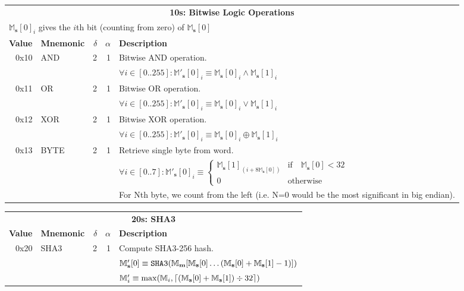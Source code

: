 \documentclass[9pt,oneside]{amsart}
\DeclarePairedDelimiter{\ceil}{\lceil}{\rceil}
\begin{document}
\begin{tabular*}{\columnwidth}[h]{rlrrl}
\toprule
\multicolumn{5}{c}{\textbf{10s: Bitwise Logic Operations}} \\
\multicolumn{5}{l}{$\mathbb{M}_\mathbf{s}[0]_i$ gives the $i$th bit (counting from zero) of $\mathbb{M}_\mathbf{s}[0]$} \vspace{5pt} \\
\textbf{Value} & \textbf{Mnemonic} & $\delta$ & $\alpha$ & \textbf{Description} \vspace{5pt} \\
0x10 & {\small AND} & 2 & 1 & Bitwise AND operation. \\
&&&& $\forall i \in [0..255]: \mathbb{M}'_\mathbf{s}[0]_i \equiv \mathbb{M}_\mathbf{s}[0]_i \wedge \mathbb{M}_\mathbf{s}[1]_i$ \\
\midrule
0x11 & {\small OR} & 2 & 1 & Bitwise OR operation. \\
&&&& $\forall i \in [0..255]: \mathbb{M}'_\mathbf{s}[0]_i \equiv \mathbb{M}_\mathbf{s}[0]_i \vee \mathbb{M}_\mathbf{s}[1]_i$ \\
\midrule
0x12 & {\small XOR} & 2 & 1 & Bitwise XOR operation. \\
&&&& $\forall i \in [0..255]: \mathbb{M}'_\mathbf{s}[0]_i \equiv \mathbb{M}_\mathbf{s}[0]_i \oplus \mathbb{M}_\mathbf{s}[1]_i$ \\
\midrule
0x13 & {\small BYTE} & 2 & 1 & Retrieve single byte from word. \\
&&&& $\forall i \in [0..7]: \mathbb{M}'_\mathbf{s}[0]_i \equiv \begin{cases} \mathbb{M}_\mathbf{s}[1]_{(i + 8\mathbb{M}_\mathbf{s}[0])} & \text{if} \quad \mathbb{M}_\mathbf{s}[0] < 32 \\ 0 & \text{otherwise} \end{cases} $\\
&&&& For Nth byte, we count from the left (i.e. N=0 would be the most significant in big endian). \\
\bottomrule
\end{tabular*}

\begin{tabular*}{\columnwidth}[h]{rlrrl}
\toprule
\multicolumn{5}{c}{\textbf{20s: SHA3}} \vspace{5pt} \\
\textbf{Value} & \textbf{Mnemonic} & $\delta$ & $\alpha$ & \textbf{Description} \vspace{5pt} \\
0x20 & {\small SHA3} & 2 & 1 & Compute SHA3-256 hash. \\
&&&& $\mathbb{M}'_\mathbf{s}[0] \equiv \mathtt{\tiny SHA3}(\mathbb{M}_\mathbf{m}[ \mathbb{M}_\mathbf{s}[0] \dots (\mathbb{M}_\mathbf{s}[0] + \mathbb{M}_\mathbf{s}[1] - 1) ])$ \\
&&&& $\mathbb{M}'_i \equiv \max(\mathbb{M}_i, \ceil{ (\mathbb{M}_\mathbf{s}[0] + \mathbb{M}_\mathbf{s}[1]) \div 32 })$ \\
\bottomrule
\end{tabular*}
\end{document}

